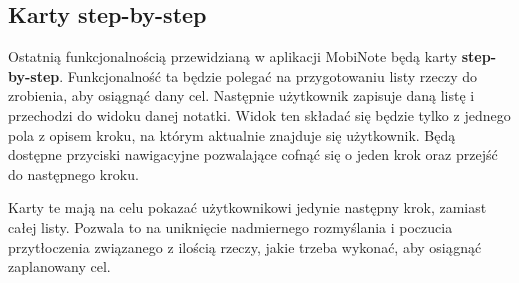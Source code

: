 \subsection{Karty step-by-step}

Ostatnią funkcjonalnością przewidzianą w aplikacji MobiNote będą karty \textbf{step-by-step}.
Funkcjonalność ta będzie polegać na przygotowaniu listy rzeczy do zrobienia, aby osiągnąć dany cel. Następnie użytkownik zapisuje daną listę i przechodzi do widoku danej notatki. Widok ten składać się będzie tylko z jednego pola z opisem kroku, na którym aktualnie znajduje się użytkownik. Będą dostępne przyciski nawigacyjne pozwalające cofnąć się o jeden krok oraz przejść do następnego kroku.

Karty te mają na celu pokazać użytkownikowi jedynie następny krok, zamiast całej listy. Pozwala to na uniknięcie nadmiernego rozmyślania i poczucia przytłoczenia związanego z ilością rzeczy, jakie trzeba wykonać, aby osiągnąć zaplanowany cel.